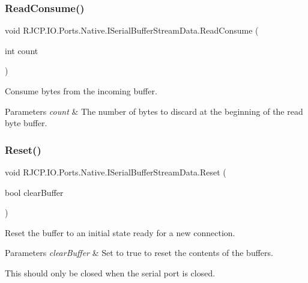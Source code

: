 \subsubsection{\texorpdfstring{ReadConsume()}{ReadConsume()}}
{\footnotesize\ttfamily void R\+J\+C\+P.\+I\+O.\+Ports.\+Native.\+I\+Serial\+Buffer\+Stream\+Data.\+Read\+Consume (\begin{DoxyParamCaption}\item[{int}]{count }\end{DoxyParamCaption})}



Consume bytes from the incoming buffer. 


\begin{DoxyParams}{Parameters}
{\em count} & The number of bytes to discard at the beginning of the read byte buffer.\\
\hline
\end{DoxyParams}
\mbox{\label{interface_r_j_c_p_1_1_i_o_1_1_ports_1_1_native_1_1_i_serial_buffer_stream_data_afbf7fddda140259c624de77a936eee28}} 
\subsubsection{\texorpdfstring{Reset()}{Reset()}}
{\footnotesize\ttfamily void R\+J\+C\+P.\+I\+O.\+Ports.\+Native.\+I\+Serial\+Buffer\+Stream\+Data.\+Reset (\begin{DoxyParamCaption}\item[{bool}]{clear\+Buffer }\end{DoxyParamCaption})}



Reset the buffer to an initial state ready for a new connection. 


\begin{DoxyParams}{Parameters}
{\em clear\+Buffer} & Set to {\ttfamily true} to reset the contents of the buffers.\\
\hline
\end{DoxyParams}


This should only be closed when the serial port is closed. \mbox{\label{interface_r_j_c_p_1_1_i_o_1_1_ports_1_1_native_1_1_i_serial_buffer_stream_data_a15378fb8e021e06d581171d0af31dd65}} 
